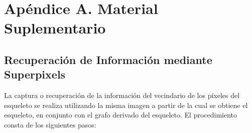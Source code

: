 \chapter*{Apéndice A. Material Suplementario}
\label{chap:apendice}
\section{Recuperaci\'on de Informaci\'on mediante Superpixels}
\label{sec:superpixels}

La captura o recuperaci\'on de la informaci\'on del vecindario de los p\'ixeles del esqueleto se realiza utilizando la misma imagen a partir de la cual se obtiene el esqueleto, en conjunto con el grafo derivado del esqueleto. El procedimiento consta de los siguientes pasos:



